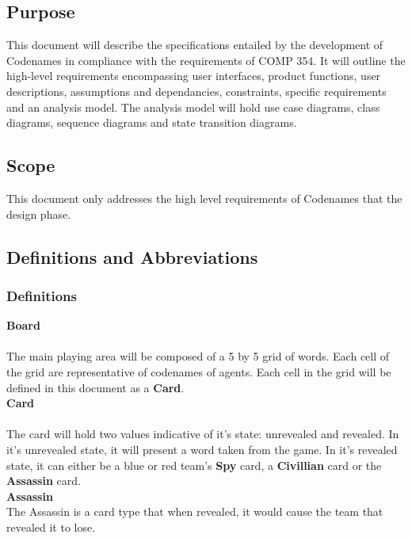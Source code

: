 \documentclass[10pt, a4paper]{article}
\begin{document}
	\subsection{Purpose}
	
	This document will describe the specifications entailed by the development of Codenames in compliance with the requirements of COMP 354. It will outline the high-level requirements encompassing user interfaces, product functions, user descriptions, assumptions and dependancies, constraints, specific requirements and an analysis model. The analysis model will hold use case diagrams, class diagrams, sequence diagrams and state transition diagrams.
	
	\subsection{Scope}
	
	This document only addresses the high level requirements of Codenames  that the design phase.  \\
	

	\subsection{Definitions and Abbreviations}
	
		\subsubsection{Definitions}
	
		\textbf{Board} \\
		\\
		The main playing area will be composed of a 5 by 5 grid of words. Each cell of the grid are representative of codenames of agents. Each cell in the grid will be defined in this document as a \textbf{Card}.\\
	
		\textbf{Card} \\
		\\
		The card will hold two values indicative of it's state: unrevealed
		and revealed. In it's unrevealed state, it will present a word taken from the game. In it's revealed state, it can either be a blue or red team's \textbf{Spy} card, a \textbf{Civillian} card or the \textbf{Assassin} card.\\
		
		\textbf{Assassin} \\
		The Assassin is a card type that when revealed, it would cause the team that revealed it to lose.\\
		
\end{document}
